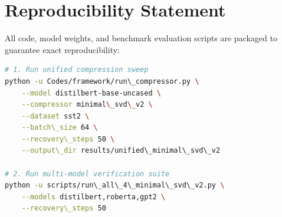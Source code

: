 \section{Reproducibility Statement}
All code, model weights, and benchmark evaluation scripts are packaged to guarantee exact reproducibility:
\begin{lstlisting}[language=bash]
# 1. Run unified compression sweep
python -u Codes/framework/run\_compressor.py \
    --model distilbert-base-uncased \
    --compressor minimal\_svd\_v2 \
    --dataset sst2 \
    --batch\_size 64 \
    --recovery\_steps 50 \
    --output\_dir results/unified\_minimal\_svd\_v2

# 2. Run multi-model verification suite
python -u scripts/run\_all\_4\_minimal\_svd\_v2.py \
    --models distilbert,roberta,gpt2 \
    --recovery\_steps 50
\end{lstlisting}
